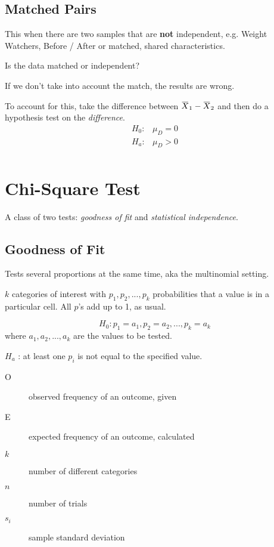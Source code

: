 \documentclass[11pt, oneside]{article}   	%
\newcommand{\overbar}[1]{\mkern 1.5mu\overline{\mkern-1.5mu#1\mkern-1.5mu}\mkern 1.5mu}
\begin{document}
\subsection{Matched Pairs}

This when there are two samples that are \textbf{not} independent, e.g. Weight Watchers, Before / After or matched, shared characteristics.

Is the data matched or independent?

If we don't take into account the match, the results are wrong.

To account for this, take the difference between $\overbar{X}_1 - \overbar{X}_2$ and then do a hypothesis test on the \textit{difference}. 
\begin{align*}
H_0 : & \mu_D = 0 \\
H_a : & \mu_D > 0 \\
\end{align*}

\section{Chi-Square Test}

A class of two tests: \textit{goodness of fit} and \textit{statistical independence}.

\subsection{Goodness of Fit}

Tests several proportions at the same time, aka the multinomial setting.

$k$ categories of interest with $p_1, p_2, ... , p_k$ probabilities that a value is in a particular cell. All $p$'s add up to 1, as usual.

\[
H_0 : p_1 = a_1, p_2 = a_2, ... , p_k = a_k
\]
where $a_1, a_2, ... , a_k$ are the values to be tested.

$H_a$ : at least one $p_i$ is not equal to the specified value.

 \begin{description}
 \item [O] observed frequency of an outcome, given
 \item[E] expected frequency of an outcome, calculated
 \item[$k$]number of different categories
 \item[$n$]number of trials
 \item[$s_i$]sample standard deviation
 \end{description}
\end{document}
